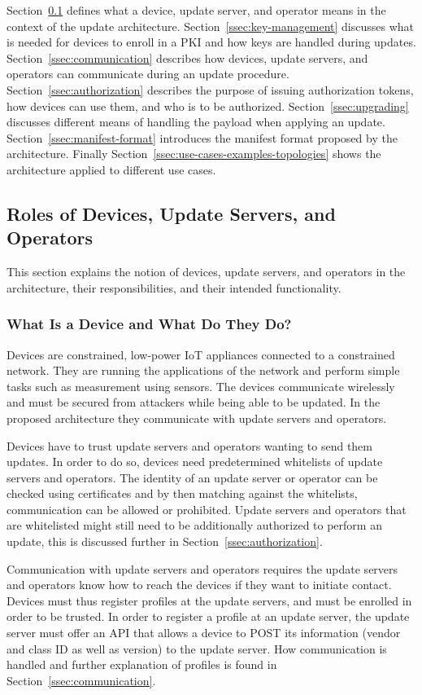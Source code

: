 \documentclass[0-thesis.tex]{subfiles}
\begin{document}
Section~\ref{ssec:roles} defines what a device, update server, and operator means in the
context of the update architecture. Section~\ref{ssec:key-management} discusses what is
needed for devices to enroll in a PKI and how keys are handled during updates.
Section~\ref{ssec:communication} describes how devices, update servers, and operators can
communicate during an update procedure. Section~\ref{ssec:authorization} describes the
purpose of issuing authorization tokens, how devices can use them, and who is to be
authorized. Section~\ref{ssec:upgrading} discusses different means of handling the payload
when applying an update. Section~\ref{ssec:manifest-format} introduces the manifest format
proposed by the architecture. Finally Section~\ref{ssec:use-cases-examples-topologies}
shows the architecture applied to different use cases.

\subsection{Roles of Devices, Update Servers, and Operators}
\label{ssec:roles}
This section explains the notion of devices, update servers, and operators in the
architecture, their responsibilities, and their intended functionality.

\subsubsection{What Is a Device and What Do They Do?}
\label{sssec:what-is-a-device}
Devices are constrained, low-power IoT appliances connected to a constrained network. They
are running the applications of the network and perform simple tasks such as measurement
using sensors. The devices communicate wirelessly and must be secured from attackers while
being able to be updated. In the proposed architecture they communicate with update
servers and operators.

Devices have to trust update servers and operators wanting to send them updates. In order
to do so, devices need predetermined whitelists of update servers and operators. The
identity of an update server or operator can be checked using certificates and by then
matching against the whitelists, communication can be allowed or prohibited. Update
servers and operators that are whitelisted might still need to be additionally authorized
to perform an update, this is discussed further in Section~\ref{ssec:authorization}.

Communication with update servers and operators requires the update servers and operators
know how to reach the devices if they want to initiate contact. Devices must thus register
profiles at the update servers, and must be enrolled in order to be trusted. In order to
register a profile at an update server, the update server must offer an API that allows a
device to POST its information (vendor and class ID as well as version) to the update
server. How communication is handled and further explanation of profiles is found in
Section~\ref{ssec:communication}.
\end{document}

